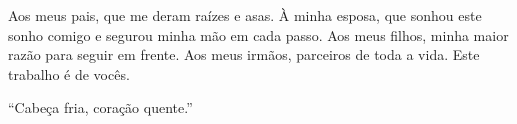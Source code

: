 
\begin{dedicatoria}
Aos meus pais, que me deram raízes e asas. À minha esposa, que sonhou este
sonho comigo e segurou minha mão em cada passo. Aos meus filhos, minha maior
razão para seguir em frente. Aos meus irmãos, parceiros de toda a vida. Este
trabalho é de vocês.

\vspace{\baselineskip}
``Cabeça fria, coração quente.''
\end{dedicatoria}
